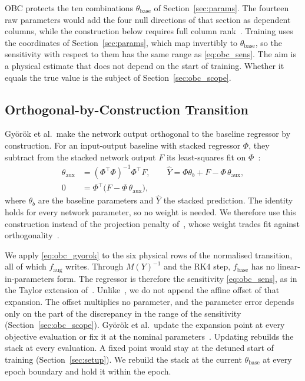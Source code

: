 OBC protects the ten combinations $\theta_{\mathrm{base}}$ of
Section~\ref{sec:params}.
The fourteen raw parameters would add the four null directions of that
section as dependent columns, while the construction below requires full
column rank~\cite[Assumption~1]{gyorok2026obc}.
Training uses the coordinates of Section~\ref{sec:params}, which map
invertibly to $\theta_{\mathrm{base}}$, so the sensitivity with respect to
them has the same range as \eqref{eq:obc_sens}.
The aim is a physical estimate that does not depend on the start of
training.
Whether it equals the true value is the subject of
Section~\ref{sec:obc_scope}.

\subsection{Orthogonal-by-Construction Transition}\label{sec:obc_map}
Gy\"or\"ok et al.\ make the network output orthogonal to the baseline
regressor by construction.
For an input-output baseline with stacked regressor $\Phi$, they subtract
from the stacked network output $F$ its least-squares fit on
$\Phi$~\cite[Eqs.~(8), (9), (11)]{gyorok2026obc}:
\begin{equation}
\begin{aligned}
 \theta_{\mathrm{aux}}&=(\Phi^\top\Phi)^{-1}\Phi^\top F,\qquad
 \hat Y=\Phi\theta_b+F-\Phi\,\theta_{\mathrm{aux}},\\
 0&=\Phi^\top\bigl(F-\Phi\,\theta_{\mathrm{aux}}\bigr),
\end{aligned}
\label{eq:obc_gyorok}
\end{equation}
where $\theta_b$ are the baseline parameters and $\hat Y$ the stacked
prediction.
The identity holds for every network parameter, so no weight is needed.
We therefore use this construction instead of the projection penalty
of~\cite[Eq.~(13)]{gyorok2025l4dc}, whose weight trades fit against
orthogonality~\cite[Sec.~1]{gyorok2026obc}.

We apply \eqref{eq:obc_gyorok} to the six physical rows of the normalised
transition, all of which $f_{\mathrm{aug}}$ writes.
Through $M(Y)^{-1}$ and the RK4 step, $f_{\mathrm{base}}$ has no
linear-in-parameters form.
The regressor is therefore the sensitivity \eqref{eq:obc_sens}, as in the
Taylor extension of~\cite[Sec.~4]{gyorok2025l4dc}.
Unlike~\cite[Eq.~(18)]{gyorok2025l4dc}, we do not append the affine offset
of that expansion.
The offset multiplies no parameter, and the parameter error depends only on
the part of the discrepancy in the range of the sensitivity
(Section~\ref{sec:obc_scope}).
Gy\"or\"ok et al.\ update the expansion point at every objective evaluation
or fix it at the nominal parameters~\cite[Sec.~4]{gyorok2025l4dc}.
Updating rebuilds the stack at every evaluation.
A fixed point would stay at the detuned start of training
(Section~\ref{sec:setup}).
We rebuild the stack at the current $\theta_{\mathrm{base}}$ at every epoch
boundary and hold it within the epoch.

